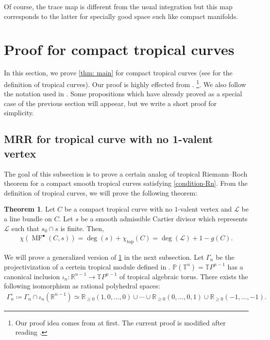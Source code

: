 \documentclass[a4paper,dvipdfmx,reqno,12pt]{amsart}
\theoremstyle{definition}
\newtheorem{theorem}{Theorem}[section]
\newcommand{\deq}{\coloneqq}
\newcommand{\opn}[1]{\operatorname{#1}}
\numberwithin{equation}{section}
\begin{document}
Of course, the trace map is different from the usual integration 
but this map corresponds to the latter 
for specially good space such like compact manifolds.

\section{Proof for compact tropical curves}
In this section, we prove \cref{thm: main} for 
compact tropical curves
(see \cite[Definition 3.1]{mikhalkinTropicalCurvesTheir2008a} 
for the definition of tropical curves).
Our proof is highly effected from 
\cite{knill2012graph,MR2676658,auroux2022lagrangian}.
\footnote{Our proof idea comes from 
\cite{knill2012graph,MR2676658} at first.  
The current proof is modified after reading 
\cite{auroux2022lagrangian}.}.
We also follow the notation used in 
\cite{auroux2022lagrangian}.
Some propositions which have already proved as a special case
of the previous section will appeear, but we write a short proof 
for simplicity.

\subsection{MRR for tropical curve with no 1-valent
vertex}

The goal of this subsection is to prove a certain 
analog of tropical Riemann--Roch theorem for
a compact smooth tropical 
curves satisfying \cref{condition-Rn}. 
From the definition of tropical curves, we will prove
the following theorem:
\begin{theorem}
\label{theorem-MRR-metric-graph}
Let $C$ be a compact tropical curve with 
no $1$-valent vertex and 
$\mathcal{L}$ be a line bundle on $C$.
Let $s$ be a smooth admissible Cartier divisor which
represents $\mathcal{L}$ such that 
$s_0\cap s$ is finite. Then,
\begin{align}
  \chi(\opn{MF}^{\bullet}(C,s))=\opn{deg}(s)+
\chi_{\opn{top}}(C)=\opn{deg}(\mathcal{L})+1-g(C).
\end{align}
\end{theorem}
We will prove a generalized version of 
\cref{theorem-MRR-metric-graph} in the next subsection.
Let $\Gamma_{n}$ be the projectivization of 
a certein tropical module defined in 
\cite[2.2]{mikhalkinTropicalCurvesTheir2008a}.
$\mathbb{P}(\mathbb{T}^{n})=\mathbb{T}P^{n-1}$ has a canonical inclusion
$\iota_n\colon \mathbb{R}^{n-1}\to 
\mathbb{T}P^{n-1}$ 
of tropical algebraic torus.
There exists the following isomorphism as rational 
polyhedral spaces:
\begin{align}
\Gamma_{n}^{\circ}\deq \Gamma_{n}\cap \iota_n(\mathbb{R}^{n-1}) \simeq \mathbb{R}_{\geq 0}(1,0,\ldots,0)\cup \cdots
\cup {\mathbb{R}}_{\geq 0}(0,\ldots,0,1)\cup 
{\mathbb{R}}_{\geq 0}(-1,\ldots,-1).
\end{align}
\end{document}

